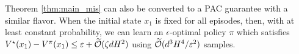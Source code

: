 Theorem \ref{thm:main_mis} can also be converted to a PAC guarantee with a similar flavor. 
When the initial state $x_1$ is fixed for all episodes, then, with at least constant probability, we can learn an $\epsilon$-optimal policy $\pi$ which satisfies $V^\star (x_1) - V^\pi (x_1 ) \leq \varepsilon + \widetilde{\mathcal{O}}(\zeta d H^2)$ using $\widetilde{\mathcal{O}}(d^3H^4/\varepsilon^2)$ samples. 








